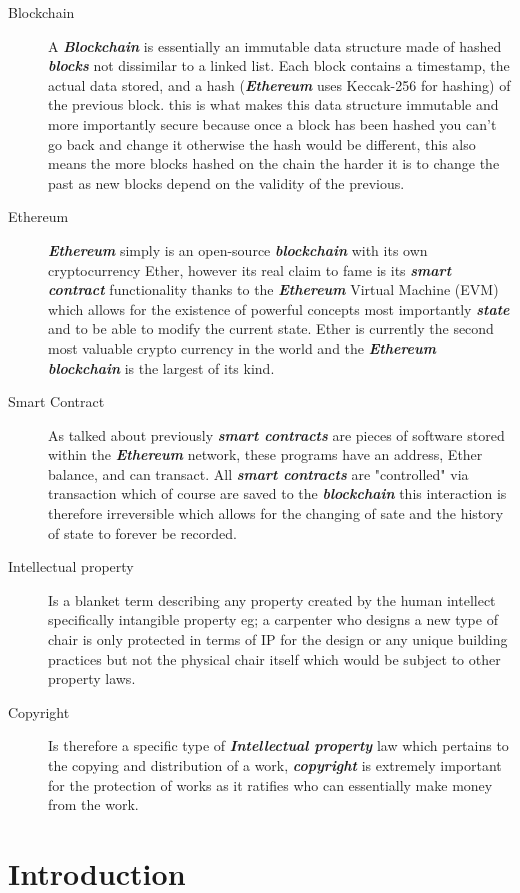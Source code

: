\documentclass[12pt]{article}
\newcommand{\keyword}[1]{\textbf{\textit{#1}}}
\begin{document}
\begin{description}
  \item[Blockchain] A \keyword{Blockchain} is essentially an immutable data structure made of hashed \keyword{blocks} not dissimilar to a linked list. Each block contains a timestamp, the actual data stored, and a hash (\keyword{Ethereum} uses Keccak-256 for hashing) of the previous block. this is what makes this data structure immutable and more importantly secure because once a block has been hashed you can't go back and change it otherwise the hash would be different, this also means the more blocks hashed on the chain the harder it is to change the past as new blocks depend on the validity of the previous.
  \item[Ethereum] \keyword{Ethereum} simply is an open-source \keyword{blockchain} with its own cryptocurrency Ether, however its real claim to fame is its \keyword{smart contract} functionality thanks to the \keyword{Ethereum} Virtual Machine (EVM) which allows for the existence of powerful concepts most importantly \keyword{state} and to be able to modify the current state. Ether is currently the second most valuable crypto currency in the world and the \keyword{Ethereum} \keyword{blockchain} is the largest of its kind.
  \item[Smart Contract] As talked about previously \keyword{smart contracts} are pieces of software stored within the \keyword{Ethereum} network, these programs have an address, Ether balance, and can transact. All \keyword{smart contracts} are "controlled" via transaction which of course are saved to the \keyword{blockchain} this interaction is therefore irreversible which allows for the changing of sate and the history of state to forever be recorded.
  \item[Intellectual property] Is a blanket term describing any property created by the human intellect specifically intangible property eg; a carpenter who designs a new type of chair is only protected in terms of IP for the design or any unique building practices but not the physical chair itself which would be subject to other property laws.
  \item[Copyright] Is therefore a specific type of \keyword{Intellectual property} law which pertains to the copying and distribution of a work, \keyword{copyright} is extremely important for the protection of works as it ratifies who can essentially make money from the work.
\end{description}

\section{Introduction}
\end{document}
